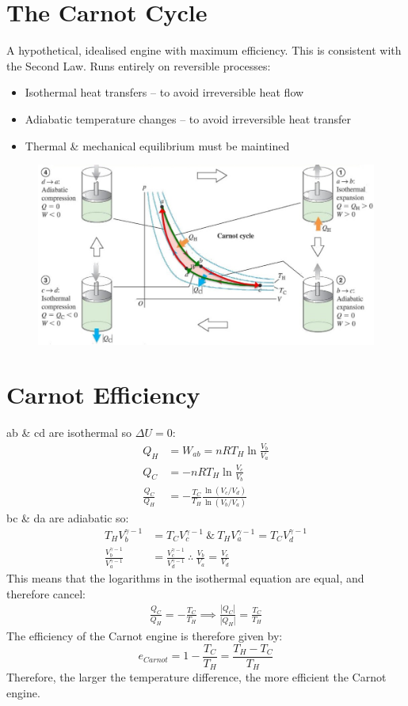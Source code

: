 \documentclass[a4paper, 11pt, normalem]{report}
\begin{document}
\section{The Carnot Cycle}
A hypothetical, idealised engine with maximum efficiency.
This is consistent with the Second Law.
Runs entirely on reversible processes:
\begin{itemize}
	\item Isothermal heat transfers -- to avoid irreversible heat flow
	\item Adiabatic temperature changes -- to avoid irreversible heat transfer
	\item Thermal \& mechanical equilibrium must be maintined
\end{itemize}
\begin{figure}[H]
    \centering
    \includegraphics[scale=0.55]{Carnot.jpg}
\end{figure}

\section{Carnot Efficiency}
ab \& cd are isothermal so ${\Delta}U = 0$:
\begin{align}
    Q_{H} &= W_{ab} = nRT_{H}\ln{\frac{V_{b}}{V_{a}}} \\
    Q_{C} &= -nRT_{H}\ln{\frac{V_{c}}{V_{b}}} \\
    \frac{Q_{C}}{Q_{H}} &= -\frac{T_{C}}{T_{H}}\frac{\ln{(V_{c}/V_{d})}}{\ln{(V_{b}/V_{a})}}
\end{align}
bc \& da are adiabatic so:
\begin{align}
    T_{H}V_{b}^{\gamma - 1} &= T_{C}V_{c}^{\gamma - 1} ~\&~ T_{H}V_{a}^{\gamma - 1} = T_{C}V_{d}^{\gamma - 1} \\
    \frac{V_{b}^{\gamma - 1}}{V_{a}^{\gamma - 1}} &= \frac{V_{c}^{\gamma - 1}}{V_{d}^{\gamma - 1}} ~\therefore~ \frac{V_{b}}{V_{a}} = \frac{V_{c}}{V_{d}}
\end{align}
This means that the logarithms in the isothermal equation are equal, and therefore cancel:
\begin{align}
	\frac{Q_{C}}{Q_{H}} = -\frac{T_{C}}{T_{H}} \implies \frac{|Q_{C}|}{|Q_{H}|} = \frac{T_{C}}{T_{H}}
\end{align}
The efficiency of the Carnot engine is therefore given by:
\begin{equation}
	e_{Carnot} = 1 - \frac{T_{C}}{T_{H}} = \frac{T_{H} - T_{C}}{T_{H}}
\end{equation}
Therefore, the larger the temperature difference, the more efficient the Carnot engine.
\end{document}
